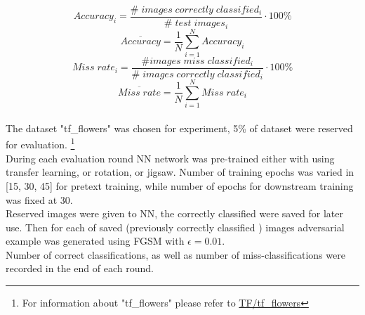 \begin{equation}
    Accuracy_i = \frac{\# \; images \; correctly \; classified_i}{\# \; test \; images_i} \cdot 100 \%
\end{equation}
\begin{equation}
    \overline{Accuracy} = \frac{1}{N}  \sum_{i=1}^{N}{Accuracy_i}
\end{equation}
\begin{equation}
    Miss \; rate_i = \frac{\# images \; miss \; classified_i}{\# \; images \; correctly \; classified_i} \cdot 100 \%
\end{equation}
\begin{equation}
    \overline{Miss \; rate} = \frac{1}{N}  \sum_{i=1}^{N}{Miss \; rate_i}
\end{equation}
\\
The dataset "tf\_flowers" was chosen for experiment, 5\% of dataset were reserved for evaluation.
\footnote{For information about "tf\_flowers" please refer to \href{https://www.tensorflow.org/datasets/catalog/tf_flowers}{TF/tf_flowers}}
\\
During each evaluation round NN network was pre-trained either with using transfer learning, or rotation, or jigsaw.
Number of training epochs was varied in [15, 30, 45] for pretext training, while number of epochs for downstream
training was fixed at 30.
\\
Reserved images were given to NN, the correctly classified were saved for later use.
Then for each of saved (previously correctly classified ) images adversarial example was generated using FGSM with $\epsilon = 0.01$.
\\
Number of correct classifications, as well as number of miss-classifications were recorded in the end of each round.